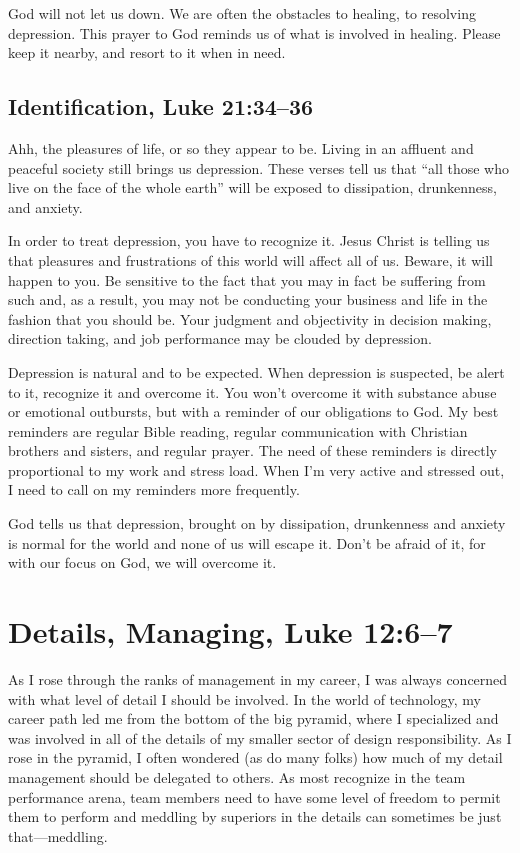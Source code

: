 \documentclass[12pt]{memoir}
\begin{document}
God will not let us down. We are often the obstacles to
healing, to resolving depression. This prayer to God reminds us of
what is involved in healing. Please keep it nearby, and resort to
it when in need.

\subsection[Identification]{Identification, Luke 21:34--36}

Ahh, the pleasures of life, or so they appear to be. Living in an
affluent and peaceful society still brings us depression. These verses
tell us that ``all those who live on the face of the whole earth''
will be exposed to dissipation, drunkenness, and anxiety.

In order to treat depression, you have to recognize it. Jesus Christ
is telling us that pleasures and frustrations of this world will affect
all of us. Beware, it will happen to you. Be sensitive to the fact
that you may in fact be suffering from such and, as a result, you may not be conducting your business and life in the fashion that you should be. Your judgment and objectivity in decision making, direction
taking, and job performance may be clouded by depression.

Depression
is natural and to be expected. When depression is suspected, be alert
to it, recognize it and overcome it. You won't overcome it with substance
abuse or emotional outbursts, but with a reminder of our obligations
to God. My best reminders are regular Bible reading, regular communication
with Christian brothers and sisters, and regular prayer. The need
of these reminders is directly proportional to my work and stress
load. When I'm very active and stressed out, I need to call on my
reminders more frequently.

God tells us that depression, brought on by dissipation, drunkenness
and anxiety is normal for the world and none of us will escape it.
Don't be afraid of it, for with our focus on God, we will overcome
it.

\section[Details, Managing]{Details, Managing, Luke 12:6--7}

As I rose through the ranks of management in my career, I was always
concerned with what level of detail I should be involved. In the world
of technology, my career path led me from the bottom of the big pyramid,
where I specialized and was involved in all of the details of my smaller
sector of design responsibility. As I rose in the pyramid, I often
wondered (as do many folks) how much of my detail management should
be delegated to others. As most recognize in the team performance
arena, team members need to have some level of freedom to permit them
to perform and meddling by superiors in the details can sometimes
be just that---meddling.
\end{document}
